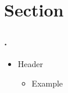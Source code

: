 \documentclass[12pt,t]{beamer}
\begin{document}
\section{Section}
\logo{\Huge\textcolor{structure.fg}{\textbullet}\vspace{8.6cm}}
\begin{frame}
\frametitle{\thesection.~\insertsection}
\begin{itemize}
\item Header
\begin{itemize}
\item Example
\end{itemize}
\end{itemize}
\end{frame}
\end{document}
